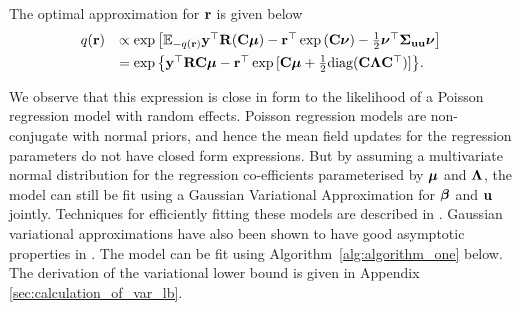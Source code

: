 
The optimal approximation for ${\bf r}$ is given below %
\begin{equation}
\label{eq:optimal_approximation}
\begin{array}{rl}
    q({\bf r}) & \propto \exp \left[ {\mathbb E}_{-q({\bf r})}{\bf y}^\top{\bf R}({\bf C}{\boldsymbol \mu}) - {\bf r}^\top\exp{({\bf C}{\boldsymbol\nu})}-\frac{1}{2} {\boldsymbol \nu}^\top {\boldsymbol\Sigma}_{{\bf u} {\bf u}} {\boldsymbol \nu} \right] \\ [1ex]
           & = \exp{ \left\{ {\bf y}^\top{\bf R}{\bf C}{\boldsymbol\mu}- {\bf r}^\top \exp{[{\bf C}{\boldsymbol\mu}+ \frac{1}{2} \text{diag}({\bf C}{\boldsymbol\Lambda}{\bf C}^\top)]} \right\} }.
\end{array}
\end{equation}

We observe that this expression is close in form to the likelihood of a Poisson
regression model with random effects. Poisson regression models are
non-conjugate with normal priors, and hence the mean field updates for the
regression parameters do not have closed form expressions. But by assuming a
multivariate normal distribution for the regression co-efficients parameterised
by ${\boldsymbol \mu}$ and ${\boldsymbol \Lambda}$, the model can still be fit using a Gaussian
Variational Approximation for ${\boldsymbol \beta}$ and ${\bf u}$ jointly. Techniques for
efficiently fitting these models are described in \cite{Ormerod2012,
Challis2013, Opper2009}. Gaussian variational approximations have also been
shown to have good asymptotic properties in \cite{Sinica2017}. The model can be
fit using Algorithm~\ref{alg:algorithm_one} below. The derivation of the
variational lower bound is given in Appendix \ref{sec:calculation_of_var_lb}.

